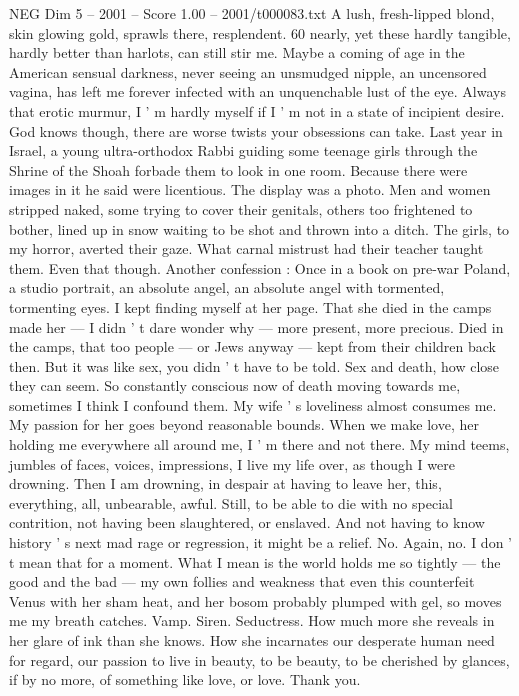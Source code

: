 \begin{textsample}{NEG Dim 5 – 2001 – Score 1.00 – 2001/t000083.txt}
A lush, fresh-lipped blond, skin glowing gold, sprawls there, resplendent. 60 nearly, yet these hardly tangible, hardly better than harlots, can still stir me.
Maybe a coming of age in the American sensual darkness, never seeing an unsmudged nipple, an uncensored vagina, has left me forever infected with an unquenchable lust of the eye.
Always that erotic murmur, I ' m hardly myself if I ' m not in a state of incipient desire.
God knows though, there are worse twists your obsessions can take.
Last year in Israel, a young ultra-orthodox Rabbi guiding some teenage girls through the Shrine of the Shoah forbade them to look in one room.
Because there were images in it he said were licentious.
The display was a photo.
Men and women stripped naked, some trying to cover their genitals, others too frightened to bother, lined up in snow waiting to be shot and thrown into a ditch.
The girls, to my horror, averted their gaze.
What carnal mistrust had their teacher taught them.
Even that though.
Another confession : Once in a book on pre-war Poland, a studio portrait, an absolute angel, an absolute angel with tormented, tormenting eyes.
I kept finding myself at her page.
That she died in the camps made her — I didn ' t dare wonder why — more present, more precious.
Died in the camps, that too people — or Jews anyway — kept from their children back then.
But it was like sex, you didn ' t have to be told.
Sex and death, how close they can seem.
So constantly conscious now of death moving towards me, sometimes I think I confound them.
My wife ' s loveliness almost consumes me.
My passion for her goes beyond reasonable bounds.
When we make love, her holding me everywhere all around me, I ' m there and not there.
My mind teems, jumbles of faces, voices, impressions, I live my life over, as though I were drowning.
Then I am drowning, in despair at having to leave her, this, everything, all, unbearable, awful.
Still, to be able to die with no special contrition, not having been slaughtered, or enslaved.
And not having to know history ' s next mad rage or regression, it might be a relief.
No.
Again, no.
I don ' t mean that for a moment.
What I mean is the world holds me so tightly — the good and the bad — my own follies and weakness that even this counterfeit Venus with her sham heat, and her bosom probably plumped with gel, so moves me my breath catches.
Vamp.
Siren.
Seductress.
How much more she reveals in her glare of ink than she knows.
How she incarnates our desperate human need for regard, our passion to live in beauty, to be beauty, to be cherished by glances, if by no more, of something like love, or love.
Thank you.

\end{textsample}
